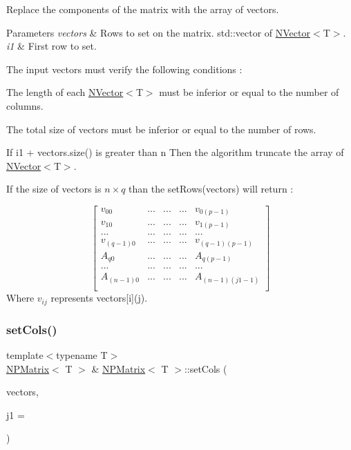 Replace the components of the matrix with the array of vectors. 


\begin{DoxyParams}{Parameters}
{\em vectors} & Rows to set on the matrix. {\ttfamily std\+::vector} of {\ttfamily \mbox{\hyperlink{class_n_vector}{N\+Vector}}$<$T$>$}.\\
\hline
{\em i1} & First row to set.\\
\hline
\end{DoxyParams}
The input {\ttfamily vectors} must verify the following conditions \+:
\begin{DoxyItemize}
\item The length of each {\ttfamily \mbox{\hyperlink{class_n_vector}{N\+Vector}}$<$T$>$} must be inferior or equal to the number of columns.
\item The total size of vectors must be inferior or equal to the number of rows.
\end{DoxyItemize}

If {\ttfamily i1 + vectors.\+size()} is greater than {\ttfamily n} Then the algorithm truncate the array of {\ttfamily \mbox{\hyperlink{class_n_vector}{N\+Vector}}$<$T$>$}.

If the size of {\ttfamily vectors} is $ n \times q $ than the {\ttfamily set\+Rows(vectors)} will return \+:

\[ \begin{bmatrix} v_{00} & ... & ... & ... & v_{0(p-1)} \\ v_{10} & ... & ... & ... & v_{1(p-1)} \\ ... & ... & ... & ... & ... \\ v_{(q-1)0} & ... & ... & ... & v_{(q-1)(p-1)} \\ A_{q0} & ... & ... & ... & A_{q(p-1)} \\ ... & ... & ... & ... & ... \\ A_{(n-1)0} & ... & ... & ... & A_{(n-1)(j1 - 1)} \\ \end{bmatrix} \] Where $ v_{ij} $ represents {\ttfamily vectors\mbox{[}i\mbox{]}(j)}. \mbox{\label{class_n_p_matrix_a3e3f383b3092d70144e1178da15c5376}} 
\subsubsection{\texorpdfstring{setCols()}{setCols()}}
{\footnotesize\ttfamily template$<$typename T$>$ \\
\mbox{\hyperlink{class_n_p_matrix}{N\+P\+Matrix}}$<$ T $>$ \& \mbox{\hyperlink{class_n_p_matrix}{N\+P\+Matrix}}$<$ T $>$\+::set\+Cols (\begin{DoxyParamCaption}\item[{const std\+::vector$<$ \mbox{\hyperlink{class_n_vector}{N\+Vector}}$<$ T $>$$>$ \&}]{vectors,  }\item[{\mbox{\hyperlink{group___n_algebra_ga1b140a2034db3f5dfe18a987745df43a}{ul\+\_\+t}}}]{j1 = {} }\end{DoxyParamCaption})}



